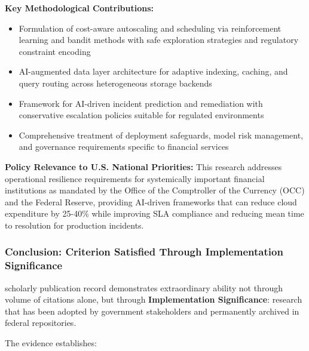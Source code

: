 \textbf{Key Methodological Contributions:}
\begin{itemize}
    \item Formulation of cost-aware autoscaling and scheduling via reinforcement learning and bandit methods with safe exploration strategies and regulatory constraint encoding
    \item AI-augmented data layer architecture for adaptive indexing, caching, and query routing across heterogeneous storage backends
    \item Framework for AI-driven incident prediction and remediation with conservative escalation policies suitable for regulated environments
    \item Comprehensive treatment of deployment safeguards, model risk management, and governance requirements specific to financial services
\end{itemize}

\textbf{Policy Relevance to U.S. National Priorities:} This research addresses operational resilience requirements for systemically important financial institutions as mandated by the Office of the Comptroller of the Currency (OCC) and the Federal Reserve, providing AI-driven frameworks that can reduce cloud expenditure by 25-40\% while improving SLA compliance and reducing mean time to resolution for production incidents.


\subsubsection{Conclusion: Criterion Satisfied Through Implementation Significance}
\label{scholar:conclusion}

\drs scholarly publication record demonstrates extraordinary ability not through volume of citations alone, but through \textbf{Implementation Significance}: research that has been adopted by government stakeholders and permanently archived in federal repositories.

The evidence establishes:

